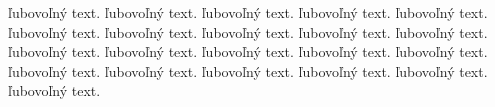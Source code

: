 ľubovoľný text. ľubovoľný text. ľubovoľný text. ľubovoľný text. ľubovoľný text. ľubovoľný text. ľubovoľný text. ľubovoľný text. ľubovoľný text. ľubovoľný text. ľubovoľný text. ľubovoľný text. ľubovoľný text. ľubovoľný text. ľubovoľný text. ľubovoľný text. ľubovoľný text. ľubovoľný text. ľubovoľný text. ľubovoľný text. ľubovoľný text. 
